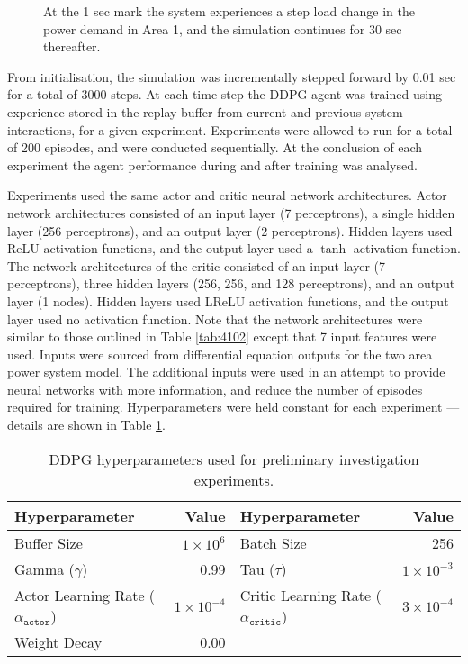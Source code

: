 \begin{figure}[h]
	\centering
	
	\caption{At the 1 sec mark the system experiences a step load change in the power demand in Area 1, and the simulation continues for 30 sec thereafter.}
	\label{fig:5001_demand_profile}
\end{figure}

From initialisation, the simulation was incrementally stepped forward by 0.01 sec for a total of 3000 steps. At each time step the DDPG agent was trained using experience stored in the replay buffer from current and previous system interactions, for a given experiment. Experiments were allowed to run for a total of 200 episodes, and were conducted sequentially. At the conclusion of each experiment the agent performance during and after training was analysed.

Experiments used the same actor and critic neural network architectures. Actor network architectures consisted of an input layer (7 perceptrons), a single hidden layer (256 perceptrons), and an output layer (2 perceptrons). Hidden layers used ReLU activation functions, and the output layer used a $\tanh$ activation function. The network architectures of the critic consisted of an input layer (7 perceptrons), three hidden layers (256, 256, and 128 perceptrons), and an output layer (1 nodes). Hidden layers used LReLU activation functions, and the output layer used no activation function. Note that the network architectures were similar to those outlined in Table \ref{tab:4102} except that 7 input features were used. Inputs were sourced from differential equation outputs for the two area power system model. The additional inputs were used in an attempt to provide neural networks with more information, and reduce the number of episodes required for training. Hyperparameters were held constant for each experiment --- details are shown in Table \ref{tab:5000_hyperparameters}.

\begin{table}[h]
	\centering
	\caption{DDPG hyperparameters used for preliminary investigation experiments.}
	\begin{tabular}{lrlr}
	\toprule
	\textbf{Hyperparameter} & \textbf{Value} & \textbf{Hyperparameter} & \textbf{Value} \\
	\midrule
	Buffer Size 	 & $1 \times 10^6$  & Batch Size 	& 256 \\
	Gamma ($\gamma$) & 0.99 	& Tau ($\tau$) 	& $1 \times 10^{-3}$ \\
	Actor Learning Rate ($\alpha_{\texttt{actor}}$) & $1 \times 10^{-4}$ & Critic Learning Rate ($\alpha_{\texttt{critic}}$) & $3 \times 10^{-4} $ \\
	Weight Decay & 0.00 & & \\
	\bottomrule
	\end{tabular}\label{tab:5000_hyperparameters}
\end{table}

